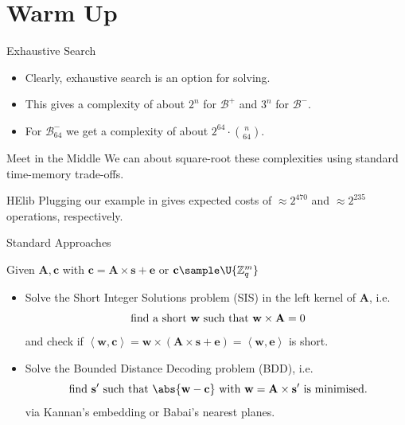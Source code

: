 \documentclass[10pt,compress]{beamer}
\renewcommand{\vec}[1]{\mathbf{#1}\xspace}
\newcommand{\Zq}{\ensuremath{\Z_q}\xspace}
\newcommand{\dotp}[2]{\ensuremath{\left\langle {#1},{#2}\right\rangle}\xspace}
\renewcommand{\B}[2][]{\ensuremath{\mathcal{B}_{#1}^{#2}}\xspace}
\renewcommand{\vec}[1]{\mathbf{#1}\xspace}
\newcommand{\Z}{\ensuremath{\mathbb{Z}}\xspace}
\begin{document}
\section{Warm Up}

\begin{frame}{Exhaustive Search}
  
  \begin{itemize}
  \item Clearly, exhaustive search is an option for solving.
  \item This gives a complexity of about $2^n$ for $\B{+}$ and $3^n$ for $\B{-}$.
  \item For $\B[64]{-}$ we get a complexity of about $2^{64} ⋅ \binom{n}{64}$.
  \end{itemize}

  \begin{block}{Meet in the Middle}
    We can about square-root these complexities using standard time-memory trade-offs.
  \end{block}

  \begin{exampleblock}{HElib}
    Plugging our example in gives expected costs of $≈ 2^{470}$ and $≈ 2^{235}$ operations, respectively.    
  \end{exampleblock}

\end{frame}

\begin{frame}{Standard Approaches}

  Given $\vec{A},\vec{c}$ with $\vec{c} = \vec{A} \times \vec{s} + \vec{e}$ or $\vec{c} \sample \U{\Zq^m}$

  \begin{itemize}

  \item Solve the \alert{Short Integer Solutions} problem (SIS) in the left kernel of $\vec{A}$, i.e.
    \[
      \textnormal{ find a short } \vec{w} \textnormal{ such that } \vec{w} \times \vec{A} = 0
    \]
    and check if $\dotp{\vec{w}}{\vec{c}} = \vec{w}\times \left(\vec{A} \times \vec{s} + \vec{e}\right) = \dotp{\vec{w}}{\vec{e}}$ is short.
    \pause{}

  \item Solve the \alert{Bounded Distance Decoding} problem (BDD), i.e.\ 
    \[
      \textnormal{ find } \vec{s'} \textnormal{ such that } \abs{\vec{w} - \vec{c}} \textnormal{ with } \vec{w} = \vec{A} \times \vec{s'} \textnormal{ is minimised} .
    \]
    via Kannan's embedding or Babai's nearest planes.


  \end{itemize}
  
\end{frame}
\end{document}
